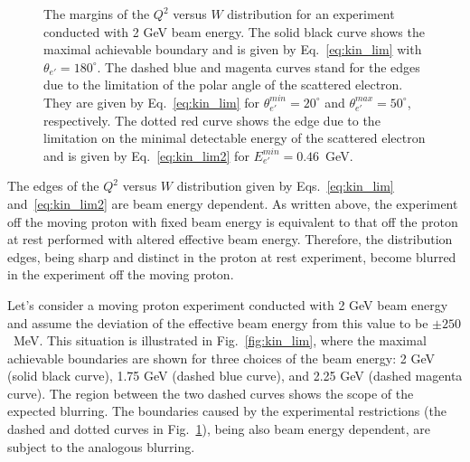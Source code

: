 \begin{figure}[!ht]
\begin{center}
\end{center}
\caption{\small  The margins of the $Q^{2}$ versus $W$ distribution for an experiment conducted with 2 GeV beam energy. The solid black curve shows the maximal achievable boundary and is given by Eq.~\eqref{eq:kin_lim} with $\theta_{e'}=180^{\circ}$. The dashed blue and magenta curves stand for the edges due to the limitation of the polar angle of the scattered electron. They are given by Eq.~\eqref{eq:kin_lim} for $\theta_{e'}^{min}=20^{\circ}$ and $\theta_{e'}^{max}=50^{\circ}$, respectively. The dotted red curve shows the edge due to the limitation on the minimal detectable energy of the scattered electron and is given by Eq.~\eqref{eq:kin_lim2} for $E_{e'}^{min} = 0.46$~GeV.}
\label{fig:kin_lim2}
\end{figure}

The edges of the $Q^{2}$ versus $W$ distribution given by Eqs.~\eqref{eq:kin_lim} and~\eqref{eq:kin_lim2} are beam energy dependent. As written above, the experiment off the moving proton with fixed beam energy is equivalent to that off the proton at rest performed with altered effective beam energy. Therefore, the distribution edges, being sharp and distinct in the proton at rest experiment, become blurred in the experiment off the moving proton.

Let's consider a moving proton experiment conducted with 2 GeV beam energy and assume the deviation of the effective beam energy from this value to be $\pm 250$~MeV. This situation is illustrated in Fig.~\ref{fig:kin_lim}, where the maximal achievable boundaries are shown for three choices of the beam energy: 2 GeV (solid black curve), 1.75 GeV (dashed blue curve), and 2.25 GeV (dashed magenta curve). The region between the two dashed curves shows the scope of the expected blurring. 
The boundaries caused by the experimental restrictions (the dashed and dotted curves in Fig.~\ref{fig:kin_lim2}), being also beam energy dependent, are subject to the analogous blurring.


